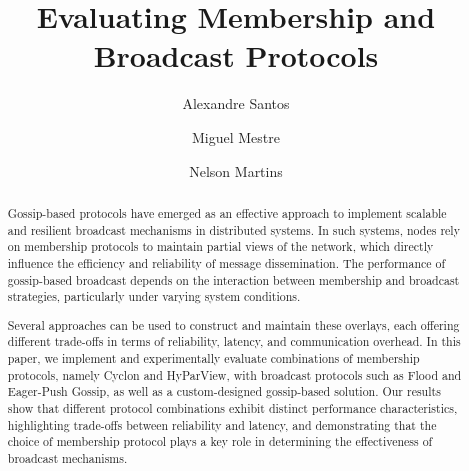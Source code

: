 \documentclass[sigconf,a4paper]{acmart}
\begin{document}
\title{Evaluating Membership and Broadcast Protocols}

\author{Alexandre Santos}

\author{Miguel Mestre}

\author{Nelson Martins}

\renewcommand{\shortauthors}{Alexandre, Miguel and Nelson.}

\begin{abstract}
  Gossip-based protocols have emerged as an effective approach to implement scalable and resilient broadcast mechanisms in distributed systems. In such systems, nodes rely on membership protocols to maintain partial views of the network, which directly influence the efficiency and reliability of message dissemination. The performance of gossip-based broadcast depends on the interaction between membership and broadcast strategies, particularly under varying system conditions.

Several approaches can be used to construct and maintain these overlays, each offering different trade-offs in terms of reliability, latency, and communication overhead. In this paper, we implement and experimentally evaluate combinations of membership protocols, namely Cyclon and HyParView, with broadcast protocols such as Flood and Eager-Push Gossip, as well as a custom-designed gossip-based solution. Our results show that different protocol combinations exhibit distinct performance characteristics, highlighting trade-offs between reliability and latency, and demonstrating that the choice of membership protocol plays a key role in determining the effectiveness of broadcast mechanisms.
\end{abstract}
\end{document}
